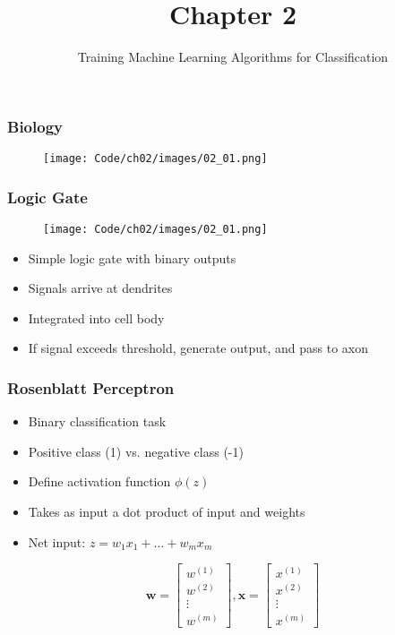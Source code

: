 \documentclass{beamer}
\title{Chapter 2}
\subtitle{Training Machine Learning Algorithms for Classification}
\begin{document}
\maketitle

\begin{frame}
  \frametitle{Biology}
   \begin{center} 
    \begin{figure}
      \texttt{[image: Code/ch02/images/02\_01.png]} 
    \end{figure}
   \end{center}
\end{frame}

\begin{frame}
  \frametitle{Logic Gate}
  \begin{center} 
    \begin{figure}
      \texttt{[image: Code/ch02/images/02\_01.png]} 
    \end{figure}
  \end{center} 
  \begin{itemize}
  \item Simple logic gate with binary outputs
  \item Signals arrive at dendrites
  \item Integrated into cell body
  \item If signal exceeds threshold, generate output, and pass to axon
  \end{itemize}
\end{frame}

\begin{frame}
  \frametitle{Rosenblatt Perceptron}
  \begin{itemize}
  \item Binary classification task
  \item Positive class (1) vs. negative class (-1)
  \item Define activation function $\phi(z)$
  \item Takes as input a dot product of input and weights
  \item Net input: $z = w_1 x_1 + \dots + w_m x_m$ 
  \end{itemize}

  \[
  \mathbf{w} = \begin{bmatrix}
    w^{(1)}  \\
    w^{(2)}  \\
    \vdots  \\
    w^{(m)}
  \end{bmatrix},
  \mathbf{x} = \begin{bmatrix}
    x^{(1)}  \\
    x^{(2)}  \\
    \vdots  \\
    x^{(m)}
  \end{bmatrix}
  \]

\end{frame}
\end{document}
